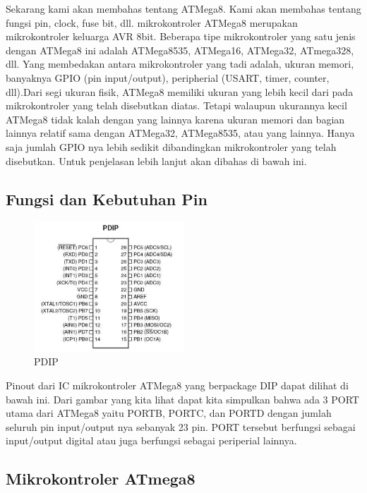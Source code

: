 		Sekarang kami akan membahas tentang ATMega8. Kami akan membahas tentang fungsi pin, clock, fuse bit, dll. mikrokontroler ATMega8 merupakan mikrokontroler keluarga AVR 8bit. Beberapa tipe mikrokontroler yang satu jenis dengan ATMega8 ini adalah ATMega8535, ATMega16, ATMega32, ATmega328, dll. Yang membedakan antara mikrokontroler yang tadi adalah, ukuran memori, banyaknya GPIO (pin input/output), peripherial (USART, timer, counter, dll).Dari segi ukuran fisik, ATMega8 memiliki ukuran yang lebih kecil dari pada mikrokontroler yang telah disebutkan diatas. Tetapi walaupun ukurannya kecil ATMega8 tidak kalah dengan yang lainnya karena ukuran memori dan bagian lainnya relatif sama dengan ATMega32, ATMega8535, atau yang lainnya. Hanya saja jumlah GPIO nya lebih sedikit dibandingkan mikrokontroler yang telah disebutkan. Untuk penjelasan lebih lanjut akan dibahas di bawah ini.
	
	\subsection{Fungsi dan Kebutuhan Pin}
	
		\begin{figure}[ht]
			\centerline{\includegraphics[width=0.5\textwidth]{figures/pdip.jpg}}
			\caption{PDIP}
			\label{pdip}
			\end{figure}
			
		Pinout dari IC mikrokontroler ATMega8 yang berpackage DIP dapat dilihat di bawah ini.
		Dari gambar yang kita lihat dapat kita simpulkan bahwa ada 3 PORT utama dari ATMega8 yaitu PORTB, PORTC, dan PORTD dengan jumlah seluruh pin input/output nya sebanyak 23 pin. PORT tersebut berfungsi sebagai input/output digital atau juga berfungsi sebagai periperial lainnya.
		
	\subsection{Mikrokontroler ATmega8}
	
